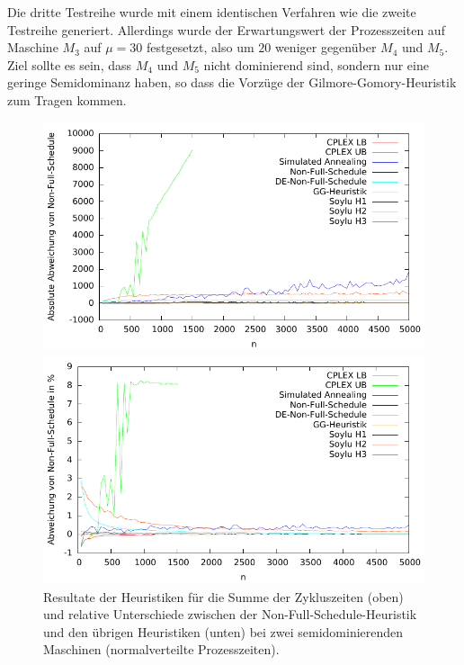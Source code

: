 \documentclass{scrreprt}
\begin{document}
Die dritte Testreihe wurde mit einem identischen Verfahren wie die zweite Testreihe generiert.
Allerdings wurde der Erwartungswert der Prozesszeiten auf Maschine $M_3$ auf $\mu=30$ festgesetzt, also um $20$ weniger gegenüber $M_4$ und $M_5$.
Ziel sollte es sein, dass $M_4$ und $M_5$ nicht dominierend sind, sondern nur eine geringe Semidominanz haben, 
so dass die Vorzüge der Gilmore-Gomory-Heuristik zum Tragen kommen.
\begin{figure}
    \begin{center}
        \includegraphics[width=.8\textwidth]{../instances/2quasidom/plot.pdf}
    \end{center}
    \begin{center}
        \includegraphics[width=.8\textwidth]{../instances/2quasidom/plotrel.pdf}
    \end{center}
    \caption{
        \label{abb:2quasidom}
        Resultate der Heuristiken für die Summe der Zykluszeiten (oben) 
        und relative Unterschiede zwischen der Non-Full-Schedule-Heuristik und den übrigen Heuristiken (unten) 
        bei zwei semidominierenden Maschinen (normalverteilte Prozesszeiten).
    }
\end{figure}
\end{document}
